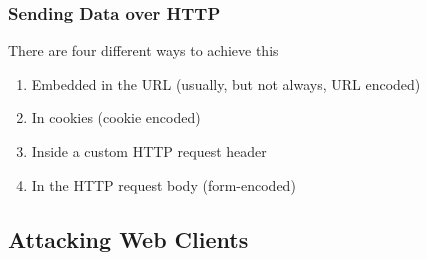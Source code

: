 \documentclass{article}
\begin{document}
\subsubsection{Sending Data over HTTP}
There are four different ways to achieve this
\begin{enumerate}
    \item Embedded in the URL (usually, but not always, URL encoded)
    \item In cookies (cookie encoded)
    \item Inside a custom HTTP request header
    \item In the HTTP request body (form-encoded)
\end{enumerate}

\subsection{Attacking Web Clients}
\end{document}
